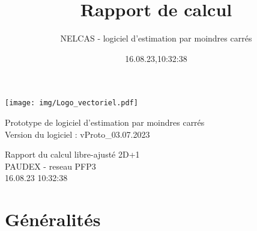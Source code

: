 \documentclass[a4paper, 9pt]{report}
\title{Rapport de calcul}
\author{NELCAS - logiciel d'estimation par moindres carrés}
\date{16.08.23,10:32:38}
\newcommand{\edithrulefill}{
        \vspace*{-6pt}
        \hrulefill
    }
\begin{document}
    
        \begin{center}
            {\huge 
    
            \vspace*{20mm}
    
            \texttt{[image: img/Logo\_vectoriel.pdf]}
    
            \vspace*{20mm}
            Prototype de logiciel d'estimation par moindres carrés \\
            
            {\normalsize Version du logiciel : vProto\_03.07.2023}
    
            \vspace*{40mm}
    
            \vspace*{20mm}
    
            \edithrulefill
           
            Rapport du calcul libre-ajusté 2D+1\\PAUDEX - reseau PFP3\\16.08.23 10\string:32\string:38\\
    
            \vspace{6pt}
            \edithrulefill
            }
        \end{center}
          
        \tableofcontents
       
        \titleformat{\chapter}[hang]{\normalfont\huge\bfseries}{\thechapter}{1em}{}
        \titlespacing*{\chapter}{0pt}{-20pt}{20pt}
    
        \chapter{Généralités}
        
\end{document}
